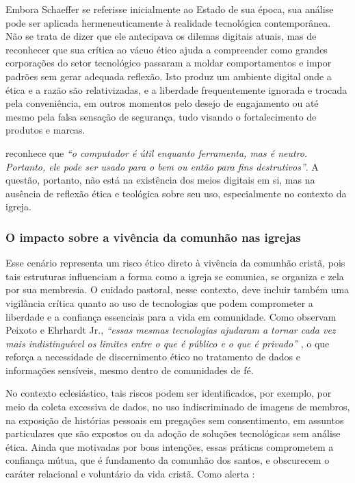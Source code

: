 Embora Schaeffer se referisse inicialmente ao Estado de sua época, sua análise pode ser aplicada hermeneuticamente à realidade tecnológica contemporânea. Não se trata de dizer que ele antecipava os dilemas digitais atuais, mas de reconhecer que sua crítica ao vácuo ético ajuda a compreender como grandes corporações do setor tecnológico passaram a moldar comportamentos e impor padrões sem gerar adequada reflexão. Isto produz um ambiente digital onde a ética e a razão são relativizadas, e a liberdade frequentemente ignorada e trocada pela conveniência, em outros momentos pelo desejo de engajamento ou até mesmo pela falsa sensação de segurança, tudo visando o fortalecimento de produtos e marcas.

 reconhece que \textit{``o computador é útil enquanto ferramenta, mas é neutro. Portanto, ele pode ser usado para o bem ou então para fins destrutivos''}. A questão, portanto, não está na existência dos meios digitais em si, mas na ausência de reflexão ética e teológica sobre seu uso, especialmente no contexto da igreja.

\subsubsection{O impacto sobre a vivência da comunhão nas igrejas}

Esse cenário representa um risco ético direto à vivência da comunhão cristã, pois tais estruturas influenciam a forma como a igreja se comunica, se organiza e zela por sua membresia. O cuidado pastoral, nesse contexto, deve incluir também uma vigilância crítica quanto ao uso de tecnologias que podem comprometer a liberdade e a confiança essenciais para a vida em comunidade. Como observam Peixoto e Ehrhardt Jr., \textit{``essas mesmas tecnologias ajudaram a tornar cada vez mais indistinguível os limites entre o que é público e o que é privado''} \cite[p.~43]{peixoto2020ressignificacao}, o que reforça a necessidade de discernimento ético no tratamento de dados e informações sensíveis, mesmo dentro de comunidades de fé.

No contexto eclesiástico, tais riscos podem ser identificados, por exemplo, por meio da coleta excessiva de dados, no uso indiscriminado de imagens de membros, na exposição de histórias pessoais em pregações sem consentimento, em assuntos particulares que são expostos ou da adoção de soluções tecnológicas sem análise ética. Ainda que motivadas por boas intenções, essas práticas comprometem a confiança mútua, que é fundamento da comunhão dos santos, e obscurecem o caráter relacional e voluntário da vida cristã. Como alerta :

